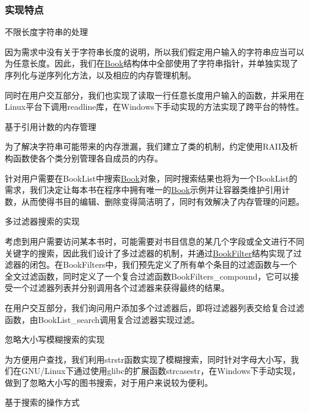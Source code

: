 \subsubsection*{实现特点}


\begin{DoxyEnumerate}
\item 不限长度字符串的处理

因为需求中没有关于字符串长度的说明，所以我们假定用户输入的字符串应当可以为任意长度。因此，我们在{\ttfamily \hyperlink{structBook}{Book}}结构体中全部使用了字符串指针，并单独实现了序列化与逆序列化方法，以及相应的内存管理机制。

同时在用户交互部分，我们也实现了读取一行任意长度用户输入的函数，并采用在{\ttfamily Linux}平台下调用{\ttfamily readline}库，在{\ttfamily Windows}下手动实现的方法实现了跨平台的特性。
\item 基于{\ttfamily 引用计数}的内存管理

为了解决字符串可能带来的内存泄漏，我们建立了类的机制，约定使用\-R\-A\-I\-I及析构函数使各个类分别管理各自成员的内存。

针对用户需要在{\ttfamily Book\-List}中搜索{\ttfamily \hyperlink{structBook}{Book}}对象，同时搜索结果也将为一个{\ttfamily Book\-List}的需求，我们决定让每本书在程序中拥有唯一的{\ttfamily \hyperlink{structBook}{Book}}示例并让容器类维护引用计数，从而使得书目的编辑、删除变得简洁明了，同时有效解决了内存管理的问题。
\item 多过滤器搜索的实现

考虑到用户需要访问某本书时，可能需要对书目信息的某几个字段或全文进行不同关键字的搜索，因此我们设计了多过滤器的机制，并通过{\ttfamily \hyperlink{structBookFilter}{Book\-Filter}}结构实现了过滤器的闭包。在{\ttfamily Book\-Filters}中，我们预先定义了所有单个条目的过滤函数与一个全文过滤函数，同时定义了一个复合过滤函数{\ttfamily Book\-Filters\-\_\-compound}，它可以接受一个过滤器列表并分别调用各个过滤器来获得最终的结果。

在用户交互部分，我们询问用户添加多个过滤器后，即将过滤器列表交给复合过滤函数，由{\ttfamily Book\-List\-\_\-search}调用复合过滤器实现过滤。
\item 忽略大小写模糊搜索的实现

为方便用户查找，我们利用{\ttfamily strstr}函数实现了模糊搜索，同时针对字母大小写，我们在{\ttfamily G\-N\-U/\-Linux}下通过使用{\ttfamily glibc}的扩展函数{\ttfamily strcasestr}，在{\ttfamily Windows}下手动实现，做到了忽略大小写的图书搜索，对于用户来说较为便利。
\item 基于搜索的操作方式


\end{DoxyEnumerate}
